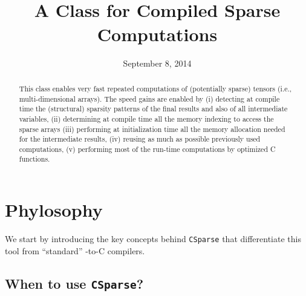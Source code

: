 \documentclass[11pt]{article}
\title{\sc \CS \\[1em]\Large A \matlab{} Class for Compiled Sparse Computations}
\author{\jph}
\date{September 8, 2014}
\newcommand{\CS}{\texttt{CSparse}}
\begin{document}
                        \maketitle

\begin{abstract}
  This class enables very fast repeated computations of (potentially
  sparse) tensors (i.e., multi-dimensional arrays). The speed gains
  are enabled by (i) detecting at compile time the (structural)
  sparsity patterns of the final results and also of all intermediate
  variables, (ii) determining at compile time all the memory indexing
  to access the sparse arrays (iii) performing at initialization time
  all the memory allocation needed for the intermediate results, (iv)
  reusing as much as possible previously used computations, (v)
  performing most of the run-time computations by optimized C
  functions.
\end{abstract}

\tableofcontents

\newpage

\section{Phylosophy}

We start by introducing the key concepts behind \CS{} that
differentiate this tool from ``standard'' \matlab-to-C compilers.

\subsection{When to use \CS?}
\end{document}
